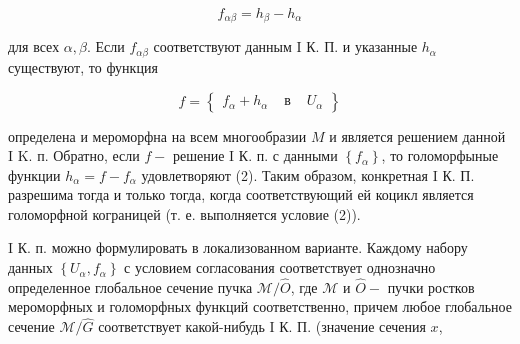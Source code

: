 \documentclass[10pt]{article}
\begin{document}
\[

f_{\alpha \beta}=h_{\beta}-h_{\alpha}

\]



для всех $\alpha, \beta$. Если $f_{\alpha \beta}$ соответствуют данным I К. П. и указанные $h_{\alpha}$ существуют, то функция



\[

f=\left\{\begin{array}{lll}

f_{\alpha}+h_{\alpha} & \text { в } & U_{\alpha}

\end{array}\right\}

\]



определена и мероморфна на всем многообразии $M$ и является решением данной I K. п. Обратно, если $f-$ решение I К. п. с данными $\left\{f_{\alpha}\right\}$, то голоморфыные функции $h_{\alpha}=f-f_{\alpha}$ удовлетворяют (2). Таким образом, конкретная I К. П. разрешима тогда и только тогда, когда соответствующий ей коцикл является голоморфной кограницей (т. е. выполняется условие (2)).



I К. п. можно формулировать в локализованном варианте. Каждому набору данных $\left\{U_{\alpha}, f_{\alpha}\right\}$ с условием согласования соответствует однозначно определенное глобальное сечение пучка $\mathscr{M} / \widehat{O}$, где $\mathscr{M}$ и $\hat{O}-$ пучки ростков мероморфных и голоморфных функций соответственно, причем любое глобальное сечение $\mathscr{M} / \widehat{G}$ соответствует какой-нибудь I К. П. (значение сечения $x$,
\end{document}
